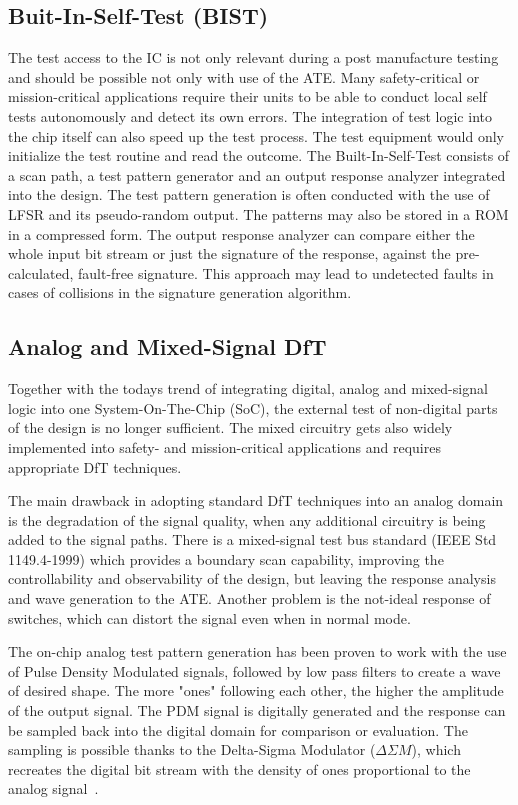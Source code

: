 \subsection{Buit-In-Self-Test (BIST)}
The test access to the IC is not only relevant during a post manufacture testing and should be possible not only with use of the ATE. Many safety-critical or mission-critical applications require their units to be able to conduct local self tests autonomously and detect its own errors. The integration of test logic into the chip itself can also speed up the test process. The test equipment would only initialize the test routine and read the outcome. The Built-In-Self-Test consists of a scan path, a test pattern generator and an output response analyzer integrated into the design. The test pattern generation is often conducted with the use of LFSR and its pseudo-random output. The patterns may also be stored in a ROM in a compressed form. The output response analyzer can compare either the whole input bit stream or just the signature of the response, against the pre-calculated, fault-free signature. This approach may lead to undetected faults in cases of collisions in the signature generation algorithm.


\subsection{Analog and Mixed-Signal DfT}\label{sub:testa}
Together with the todays trend of integrating digital, analog and mixed-signal logic into one System-On-The-Chip (SoC), the external test of non-digital parts of the design is no longer sufficient. The mixed circuitry gets also widely implemented into safety- and mission-critical applications and requires appropriate DfT techniques.

The main drawback in adopting standard DfT techniques into an analog domain is the degradation of the signal quality, when any additional circuitry is being added to the signal paths. There is a mixed-signal test bus standard (IEEE Std 1149.4-1999) which provides a boundary scan capability, improving the controllability and observability of the design, but leaving the response analysis and wave generation to the ATE. Another problem is the not-ideal response of switches, which can distort the signal even when in normal mode.

The on-chip analog test pattern generation has been proven to work with the use of Pulse Density Modulated signals, followed by low pass filters to create a wave of desired shape. The more "ones" following each other, the higher the amplitude of the output signal. The PDM signal is digitally generated and the response can be sampled back into the digital domain for comparison or evaluation. The sampling is possible thanks to the Delta-Sigma Modulator ($\Delta \Sigma M$), which recreates the digital bit stream with the density of ones proportional to the analog signal~\cite{book:Grout}.

